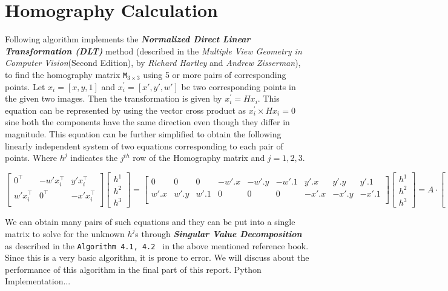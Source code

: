 \section{Homography Calculation}


Following algorithm implements the \textbf{\textit{Normalized Direct Linear Transformation (DLT)}} method (described in the \textit{Multiple View Geometry in Computer Vision}(Second Edition), by \textit{Richard Hartley} and   \textit{Andrew Zisserman}), to find the homography matrix {\tt M}$_{3 \times 3}$ using 5 or more pairs of corresponding points. Let $x_i = [x , y, 1]$ and $x_i^\prime = [x\prime , y\prime, w\prime ] $  be two corresponding points in the given two images. Then the transformation is given by $x_i^\prime = Hx_i$. This equation can be represented by using the vector cross product as  $x_i^\prime \times Hx_i = 0$ sine both the components have the same direction even though they differ in magnitude. This equation can be further simplified  to obtain the following linearly independent  system of two equations corresponding to each pair of points. Where $h^j$ indicates the $j^{th}$ row of the Homography matrix and $j = {1,2,3}$.

{\footnotesize
\begin{equation*}
	\begin{bmatrix}
		0^\top & -w\prime x_i^\top & y\prime x_i^\top\\
		w\prime x_i^\top	& 0^\top & -x\prime x_i^\top\\
	\end{bmatrix} 
	\begin{bmatrix}
		h^1\\
		h^2\\
		h^3
	\end{bmatrix} =
	\begin{bmatrix}
		0& 0 &0 & -w\prime.x&-w\prime.y&-w\prime.1& y\prime.x & y\prime.y& y\prime.1\\
		w\prime.x&w\prime.y&w\prime.1& 0& 0 &0 & -x\prime.x& -x\prime.y& -x\prime.1\\
	\end{bmatrix}
	\begin{bmatrix}
		h^1\\
		h^2\\
		h^3
	\end{bmatrix} =
	A\cdot	\begin{bmatrix}
		h^1\\
		h^2\\
		h^3
	\end{bmatrix} = O
\end{equation*}
}

We can obtain many pairs of such equations and they can be put into a single matrix to solve for the unknown  $h^j$s through \textbf{\textit{Singular Value Decomposition}} as described in the {\tt Algorithm 4.1, 4.2 } in the above mentioned reference book. Since this is a very basic algorithm, it is prone to error. We will discuss about the performance of this algorithm in the final part of this report.
{\color{cyan} Python Implementation...}
